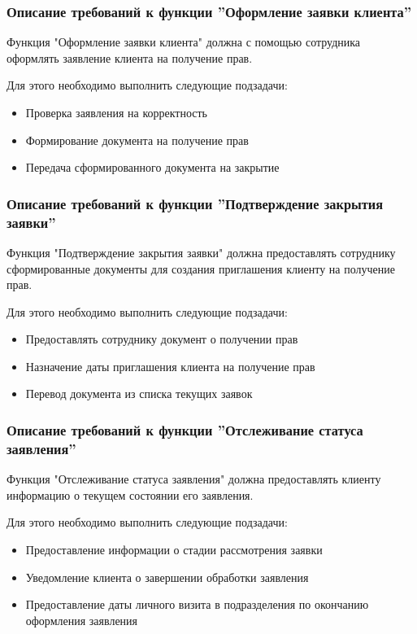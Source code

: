 \documentclass[russian, utf8, 12pt,pointsubsection,floatsubsection]{eskdtext}
\begin{document}
\subsubsection{Описание требований к функции ''Оформление заявки клиента''}
Функция "Оформление заявки клиента" должна с помощью сотрудника оформлять заявление клиента на получение прав.

Для этого необходимо выполнить следующие подзадачи:
\begin{itemize}
    \item Проверка заявления на корректность
    \item Формирование документа на получение прав
    \item Передача сформированного документа на закрытие
\end{itemize}

\subsubsection{Описание требований к функции ''Подтверждение закрытия заявки''}
Функция "Подтверждение закрытия заявки" должна предоставлять сотруднику сформированные документы для создания приглашения клиенту на получение прав.

Для этого необходимо выполнить следующие подзадачи:
\begin{itemize}
    \item Предоставлять сотруднику документ о получении прав
    \item Назначение даты приглашения клиента на получение прав
    \item Перевод документа из списка текущих заявок
\end{itemize}

\subsubsection{Описание требований к функции ''Отслеживание статуса заявления''}
Функция "Отслеживание статуса заявления" должна предоставлять клиенту информацию о текущем состоянии его заявления.

Для этого необходимо выполнить следующие подзадачи:
\begin{itemize}
    \item Предоставление информации о стадии рассмотрения заявки
    \item Уведомление клиента о завершении обработки заявления
    \item Предоставление даты личного визита в подразделения по окончанию оформления заявления
\end{itemize}
\end{document}
